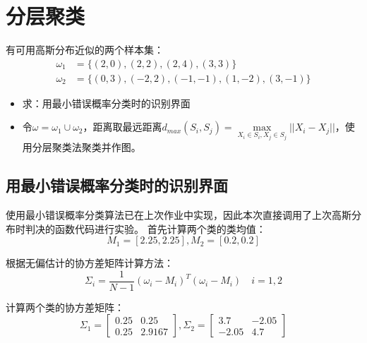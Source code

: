 \documentclass[cn]{elegantbook}
\begin{document}
\chapter{分层聚类}
有可用高斯分布近似的两个样本集：
\begin{equation}
\begin{aligned}
\omega_1&=\{(2,0),(2,2),(2,4),(3,3)\} \\
\omega_2&=\{(0,3),(-2,2),(-1,-1),(1,-2),(3,-1)\}
\end{aligned}
\end{equation}
\begin{itemize}
	\item 求：用最小错误概率分类时的识别界面
	\item 令$\omega=\omega_1\cup\omega_2$，距离取最远距离$d_{max}(S_i,S_j)=\max\limits_{X_i\in S_i,X_j\in S_j}||X_i-X_j||$，使用分层聚类法聚类并作图。
\end{itemize}

\section{用最小错误概率分类时的识别界面}
使用最小错误概率分类算法已在上次作业中实现，因此本次直接调用了上次高斯分布时判决的函数代码进行实验。
首先计算两个类的类均值：
\begin{equation}
M_1=[2.25,2.25], M_2=[0.2,0.2]
\end{equation}

根据无偏估计的协方差矩阵计算方法：
\begin{equation}
\Sigma_i=\frac{1}{N-1}\left(\omega_i-M_i\right)^T\left(\omega_i-M_i\right)\quad i=1,2
\end{equation}

计算两个类的协方差矩阵：
\begin{equation}
\Sigma_1=\left[\begin{array}{cc}
0.25 & 0.25\\
0.25 & 2.9167
\end{array}\right],\Sigma_2=\left[\begin{array}{cc}
3.7 & -2.05 \\
-2.05 & 4.7
\end{array}\right]
\end{equation}
\end{document}
